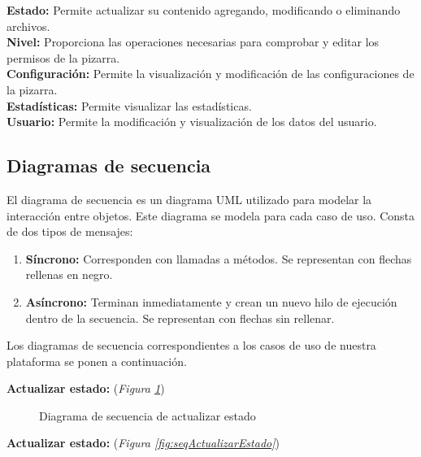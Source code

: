 \textbf{Estado:} Permite actualizar su contenido agregando, modificando o eliminando archivos.\\

\textbf{Nivel: }Proporciona las operaciones necesarias para comprobar y editar los permisos de la pizarra.\\

\textbf{Configuración: }Permite la visualización y modificación de las configuraciones de la pizarra.\\

\textbf{Estadísticas: }Permite visualizar las estadísticas.\\

\textbf{Usuario:} Permite la modificación y visualización de los datos del usuario.

\begin{sidewaysfigure}
\centering
\clases
\caption{Diagrama de clases}
\label{diagramadeclases2}
\end{sidewaysfigure}
\newpage

\subsection{Diagramas de secuencia}

El diagrama de secuencia es un diagrama UML utilizado para modelar la interacción entre objetos. Este diagrama se modela para cada caso de uso. Consta de dos tipos de mensajes:
\begin{enumerate}
	\item \textbf{Síncrono: }Corresponden con llamadas a métodos. Se representan con flechas rellenas en negro.
	\item \textbf{Asíncrono: }Terminan inmediatamente y crean un nuevo hilo de ejecución dentro de la secuencia. Se representan con flechas sin rellenar.
\end{enumerate}

Los diagramas de secuencia correspondientes a los casos de uso de nuestra plataforma se ponen a continuación.

\textbf{Actualizar estado:} (\emph{Figura \ref{fig:seqactualizarestado}}) 

\begin{figure}[H]
\centering
\seqActualizarEstado
\caption{Diagrama de secuencia de actualizar estado}
\label{fig:seqactualizarestado}
\end{figure}


\textbf{Actualizar estado:} (\emph{Figura \ref{fig:seqActualizarEstado}}) 

